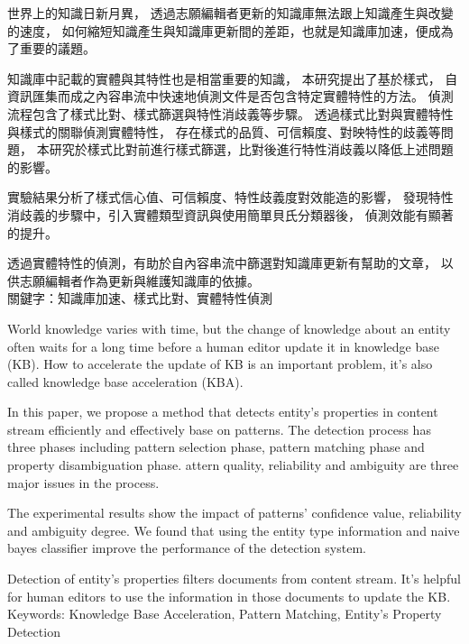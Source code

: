 \begin{abstractzh}

世界上的知識日新月異，
透過志願編輯者更新的知識庫無法跟上知識產生與改變的速度，
如何縮短知識產生與知識庫更新間的差距，也就是知識庫加速，便成為了重要的議題。

知識庫中記載的實體與其特性也是相當重要的知識，
本研究提出了基於樣式，
自資訊匯集而成之內容串流中快速地偵測文件是否包含特定實體特性的方法。
偵測流程包含了樣式比對、樣式篩選與特性消歧義等步驟。
透過樣式比對與實體特性與樣式的關聯偵測實體特性，
存在樣式的品質、可信賴度、對映特性的歧義等問題，
本研究於樣式比對前進行樣式篩選，比對後進行特性消歧義以降低上述問題的影響。

實驗結果分析了樣式信心值、可信賴度、特性歧義度對效能造的影響，
發現特性消歧義的步驟中，引入實體類型資訊與使用簡單貝氏分類器後，
偵測效能有顯著的提升。

透過實體特性的偵測，有助於自內容串流中篩選對知識庫更新有幫助的文章，
以供志願編輯者作為更新與維護知識庫的依據。\\

\noindent
關鍵字：知識庫加速、樣式比對、實體特性偵測

\end{abstractzh}

\begin{abstracten}

World knowledge varies with time, 
but the change of knowledge about an entity often waits for 
a long time before a human editor update it in knowledge base (KB).
How to accelerate the update of KB is an important problem, 
it's also called knowledge base acceleration (KBA).

In this paper, we propose a method that detects entity's properties 
in content stream efficiently and effectively base on patterns. 
The detection process has three phases including
pattern selection phase, pattern matching phase and 
property disambiguation phase.
attern quality, reliability and ambiguity 
are three major issues in the process.

The experimental results show the impact of 
patterns' confidence value, reliability and ambiguity degree.
We found that using the entity type information and naive bayes classifier 
improve the performance of the detection system.

Detection of entity's properties filters documents from content stream.
It's helpful for human editors to use the information in those documents to update the KB.\\

\noindent
Keywords: Knowledge Base Acceleration, Pattern Matching, Entity's Property Detection
\end{abstracten}

